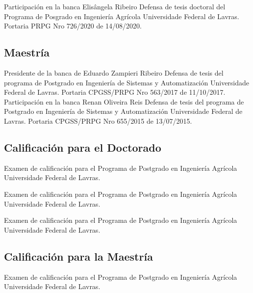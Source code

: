 \documentclass[11pt,a4paper,sans]{moderncv} %
\begin{document}
			{Participación en la banca Elisângela Ribeiro}
			{Defensa de tesis doctoral del Programa de Posgrado en Ingeniería Agrícola}{}
			{Universidade Federal de Lavras. Portaria PRPG Nro 726/2020 de 14/08/2020.}


\subsection{Maestría}
			{Presidente de la banca de Eduardo Zampieri Ribeiro}
			{Defensa de tesis del programa de Postgrado en Ingeniería de Sistemas y Automatización}{}
			{Universidade Federal de Lavras. Portaria CPGSS/PRPG Nro 563/2017 de 11/10/2017.}
			{Participación en la banca Renan Oliveira Reis}
			{Defensa de tesis del programa de Postgrado en Ingeniería de Sistemas y Automatización}{}
			{Universidade Federal de Lavras. Portaria CPGSS/PRPG Nro 655/2015 de 13/07/2015.}

\subsection{Calificación para el Doctorado}
			{}
			{Examen de calificación para el Programa de Postgrado en Ingeniería Agrícola}{}
			{Universidade Federal de Lavras.}

			{}
			{Examen de calificación para el Programa de Postgrado en Ingeniería Agrícola}{}
			{Universidade Federal de Lavras.}

			{}
			{Examen de calificación para el Programa de Postgrado en Ingeniería Agrícola}{}
			{Universidade Federal de Lavras.}
			
\subsection{Calificación para la Maestría}
			{}
			{Examen de calificación para el Programa de Postgrado en Ingeniería Agrícola}{}
			{Universidade Federal de Lavras.}
\end{document}
